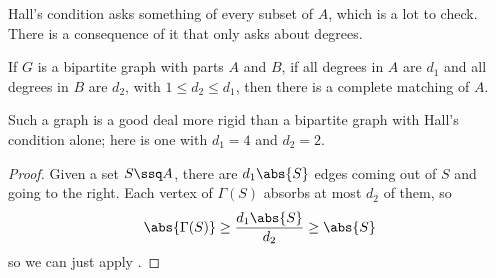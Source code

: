 Hall's condition asks something of every subset of $A$, which is a lot to check. There is a consequence of it that only asks about degrees.

\begin{boxtheorem} \label{Ch1:Cor:Biregular}
    If $G$ is a bipartite graph with parts $A$ and $B$, if all degrees in $A$ are $d_1$ and all degrees in $B$ are $d_2$, with $1 \leq d_2 \leq d_1$, then there is a complete matching of $A$.
\end{boxtheorem}

Such a graph is a good deal more rigid than a bipartite graph with Hall's condition alone; here is one with $d_1 = 4$ and $d_2 = 2$.

\begin{figure}[H]
    \centering
\end{figure}

\begin{proof}
    Given a set $S \ssq A$, there are $d_1 \abs{S}$ edges coming out of $S$ and going to the right. Each vertex of $\Gamma(S)$ absorbs at most $d_2$ of them, so
    \begin{align*}
        \abs{\Gamma(S)} \geq \frac{d_1\abs{S}}{d_2} \geq \abs{S}
    \end{align*}
    so we can just apply .
\end{proof}
